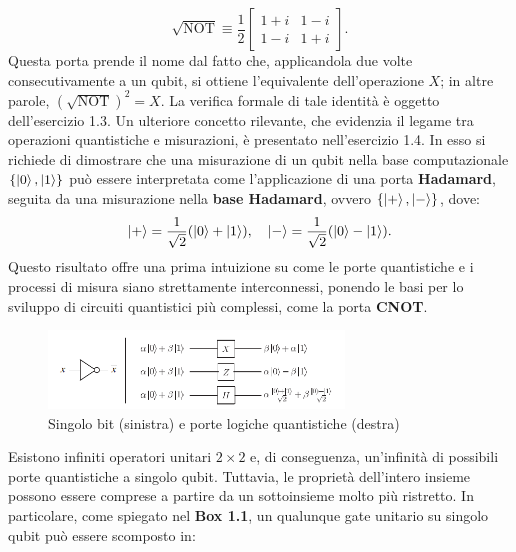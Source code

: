 \documentclass[a4paper,12pt]{report}
\theoremstyle{plain}
\begin{document}
\begin{equation}
\sqrt{\text{NOT}} \equiv \frac{1}{2} \begin{bmatrix} 1+i & 1-i \\ 1-i & 1+i \end{bmatrix}.
\end{equation}
Questa porta prende il nome dal fatto che, applicandola due volte consecutivamente a un qubit, si ottiene l'equivalente dell'operazione $X$; in altre parole, $(\sqrt{\text{NOT}})^2 = X$. La verifica formale di tale identità è oggetto dell'esercizio 1.3.
Un ulteriore concetto rilevante, che evidenzia il legame tra operazioni quantistiche e misurazioni, è presentato nell'esercizio 1.4. In esso si richiede di dimostrare che una misurazione di un qubit nella base computazionale $\{ \ket{0}, \ket{1} \}$ può essere interpretata come l'applicazione di una porta \textbf{Hadamard}, seguita da una misurazione nella \textbf{base Hadamard}, ovvero $\{ \ket{+}, \ket{-} \}$, dove:
\[
\ket{+} = \frac{1}{\sqrt{2}}(\ket{0} + \ket{1}), \quad
\ket{-} = \frac{1}{\sqrt{2}}(\ket{0} - \ket{1}).
\]
Questo risultato offre una prima intuizione su come le porte quantistiche e i processi di misura siano strettamente interconnessi, ponendo le basi per lo sviluppo di circuiti quantistici più complessi, come la porta \textbf{CNOT}.
\begin{figure}[H]
    \centering
    \includegraphics[width=0.7\textwidth]{Immagine4.png} 
    \caption{Singolo bit (sinistra) e porte logiche quantistiche (destra)}
    \label{Immagine4}
\end{figure}
\noindent Esistono infiniti operatori unitari $2\times 2$ e, di conseguenza, un'infinità di possibili porte quantistiche a singolo qubit. Tuttavia, le proprietà dell'intero insieme possono essere comprese a partire da un sottoinsieme molto più ristretto. In particolare, come spiegato nel \textbf{Box 1.1}, un qualunque gate unitario su singolo qubit può essere scomposto in:
\end{document}

